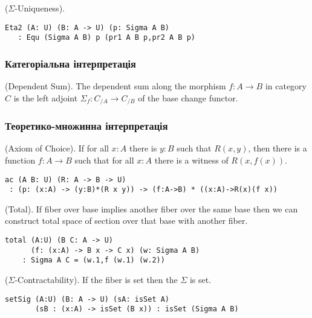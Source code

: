 \begin{theorem} ($\Sigma$-Uniqueness).
\begin{lstlisting}
Eta2 (A: U) (B: A -> U) (p: Sigma A B)
   : Equ (Sigma A B) p (pr1 A B p,pr2 A B p)
\end{lstlisting}
\end{theorem}

\subsubsection{Категоріальна інтерпретація}

\begin{definition} (Dependent Sum).
The dependent sum along the morphism $f: A \rightarrow B$ in category $C$ is the left
adjoint $\Sigma_f : C_{/A} \rightarrow C_{/B}$ of the base change functor.
\end{definition}

\subsubsection{Теоретико-множинна інтерпретація}

\begin{theorem} (Axiom of Choice).
If for all $x : A$ there is $y : B$ such that $R(x,y)$,
then there is a function $f : A \rightarrow B$
such that for all $x : A$ there is a witness of $R(x,f(x))$.
\begin{lstlisting}
ac (A B: U) (R: A -> B -> U)
 : (p: (x:A) -> (y:B)*(R x y)) -> (f:A->B) * ((x:A)->R(x)(f x))
\end{lstlisting}
\end{theorem}

\begin{theorem} (Total).
If fiber over base implies another fiber
over the same base then we can construct total space of section
over that base with another fiber.
\begin{lstlisting}
total (A:U) (B C: A -> U)
      (f: (x:A) -> B x -> C x) (w: Sigma A B)
    : Sigma A C = (w.1,f (w.1) (w.2))
\end{lstlisting}
\end{theorem}

\begin{theorem} ($\Sigma$-Contractability). If the fiber is set then the $\Sigma$ is set.
\begin{lstlisting}
setSig (A:U) (B: A -> U) (sA: isSet A)
       (sB : (x:A) -> isSet (B x)) : isSet (Sigma A B)
\end{lstlisting}
\end{theorem}

